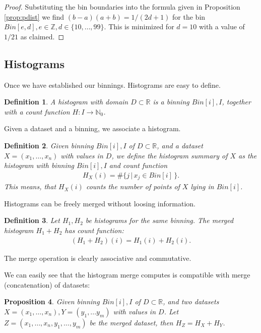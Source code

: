 \documentclass{article}
\theoremstyle{plain}
\newtheorem{definition}{Definition}[section]
\newtheorem{proposition}[definition]{Proposition}
\theoremstyle{remark}
\newcommand{\IN}{\mathbb{N}}
\newcommand{\IR}{\mathbb{R}}
\newcommand{\IZ}{\mathbb{Z}}
\newcommand{\ra}{\rightarrow}
\begin{document}
\begin{proof}
  Substituting the bin boundaries into the formula given in Proposition \ref{prop:pdist} we find
  $(b - a)(a + b) = 1/(2d + 1)$ for the bin $Bin[e,d], e \in \IZ, d \in \{ 10, \dots, 99 \}$.
  This is minimized for $d = 10$ with a value of $1/21$ as claimed.
\end{proof}

\subsection{Histograms}

Once we have established our binnings. Histograms are easy to define.

\begin{definition}
  A histogram with domain $D \subset \IR$ is a binning $Bin[i],I$, together with a count function $H: I \ra \IN_{0}$.
\end{definition}

Given a dataset and a binning, we associate a histogram.

\begin{definition}
  Given binning $Bin[i],I$ of $D \subset \IR$, and a dataset $X = (x_1,\dots,x_n)$ with values in
  $D$, we define the histogram summary of $X$ as the histogram with binning $Bin[i],I$ and count
  function
  \begin{align*}
    H_X(i) = \# \{ j \, | \, x_j \in Bin[i] \, \}.
  \end{align*}
  This means, that $H_X(i)$ counts the number of points of $X$ lying in $Bin[i]$.
\end{definition}

Histograms can be freely merged without loosing information.

\begin{definition}
  Let $H_1, H_2$ be histograms for the same binning. The merged histogram $H_1 + H_2$ has count function:
  \begin{align*}
    (H_1+H_2)(i) = H_1(i) + H_2(i).
  \end{align*}
\end{definition}
The merge operation is clearly associative and commutative.

We can easily see that the histogram merge computes is compatible with merge (concatenation) of datasets:
\begin{proposition}
  Given binning $Bin[i],I$ of $D \subset \IR$, and two datasets $X = (x_1,\dots,x_n),Y=(y_1,...y_m)$ with
  values in $D$. Let $Z=(x_1, \dots, x_n, y_1, \dots, y_m)$ be the merged dataset, then $H_Z = H_X + H_Y$.
\end{proposition}
\end{document}
